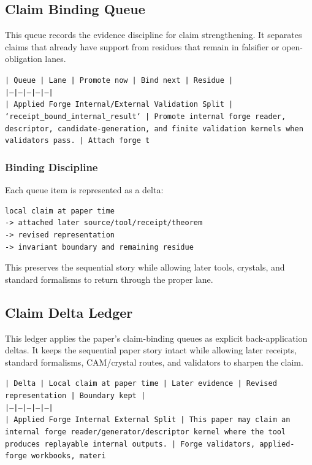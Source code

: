 \documentclass[11pt]{article}
\begin{document}
\subsection*{Claim Binding Queue}

This queue records the evidence discipline for claim strengthening. It separates claims that already have support from residues that remain in falsifier or open-obligation lanes.

\noindent\texttt{| Queue | Lane | Promote now | Bind next | Residue |}\\
\noindent\texttt{|---|---|---|---|---|}\\
\noindent\texttt{| Applied Forge Internal/External Validation Split | `receipt\_bound\_internal\_result` | Promote internal forge reader, descriptor, candidate-generation, and finite validation kernels when validators pass. | Attach forge t}\\

\subsubsection*{Binding Discipline}

Each queue item is represented as a delta:

\begin{verbatim}
local claim at paper time
-> attached later source/tool/receipt/theorem
-> revised representation
-> invariant boundary and remaining residue
\end{verbatim}

This preserves the sequential story while allowing later tools, crystals, and
standard formalisms to return through the proper lane.

\subsection*{Claim Delta Ledger}

This ledger applies the paper's claim-binding queues as explicit back-application
deltas. It keeps the sequential paper story intact while allowing later
receipts, standard formalisms, CAM/crystal routes, and validators to sharpen the
claim.

\noindent\texttt{| Delta | Local claim at paper time | Later evidence | Revised representation | Boundary kept |}\\
\noindent\texttt{|---|---|---|---|---|}\\
\noindent\texttt{| Applied Forge Internal External Split | This paper may claim an internal forge reader/generator/descriptor kernel where the tool produces replayable internal outputs. | Forge validators, applied-forge workbooks, materi}\\
\end{document}

